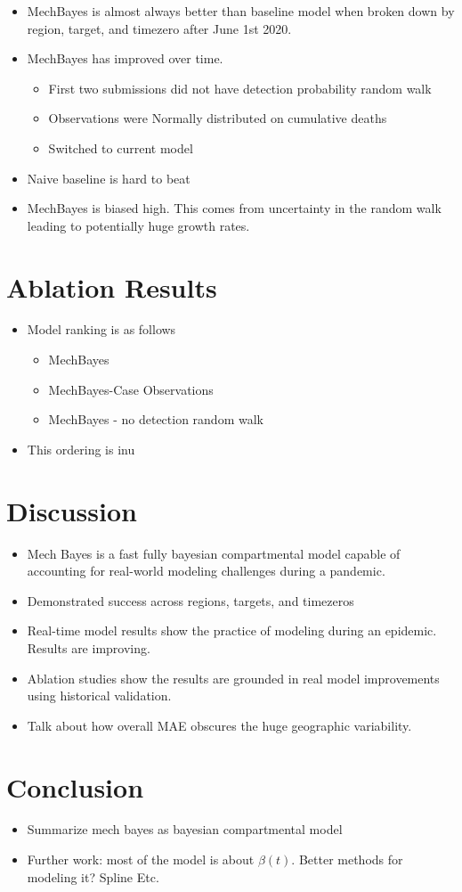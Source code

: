 \documentclass[11pt]{amsart}
\begin{document}
\begin{itemize}
\item MechBayes is almost always better than baseline model when broken down by region, target, and timezero after June 1st 2020.
\item MechBayes has improved over time.
\begin{itemize}
\item First two submissions did not have detection probability random walk
\item Observations were Normally distributed on cumulative deaths
\item Switched to current model
\end{itemize}
\item Naive baseline is hard to beat
\item MechBayes is biased high. This comes from uncertainty in the random walk leading to potentially huge growth rates. 
\end{itemize}   
   
   
   
   \section{Ablation Results}

   \begin{itemize}
   \item Model ranking is as follows
   \begin{itemize}
   \item MechBayes
   \item MechBayes-Case Observations
   \item MechBayes - no detection random walk
   \end{itemize}
   \item This ordering is inu
   \end{itemize}


\section{Discussion}
\begin{itemize}
\item Mech Bayes is a fast fully bayesian compartmental model capable of accounting for real-world modeling challenges during a pandemic.
\item Demonstrated success across regions, targets, and timezeros
\item Real-time model results show the practice of modeling during an epidemic. Results are improving.
\item Ablation studies show the results are grounded in real model improvements using historical validation.
\item Talk about how overall MAE obscures the huge geographic variability. 
\end{itemize}

\section{Conclusion}

\begin{itemize}
\item Summarize mech bayes as bayesian compartmental model
\item Further work: most of the model is about $\beta(t)$. Better methods for modeling it? Spline Etc.
\end{itemize}
\end{document}
